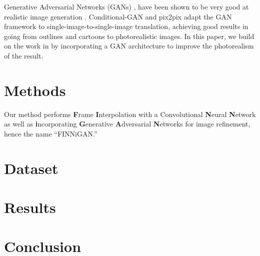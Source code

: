 \documentclass[10pt,twocolumn,letterpaper]{article}
\begin{document}
Generative Adversarial Networks (GANs) \cite{hinton}, have been shown to be very good at realistic image generation \cite{DCGAN}. Conditional-GAN \cite{CondGAN} and pix2pix \cite{pix2pix} adapt the GAN framework to single-image-to-single-image translation, achieving good results in going from outlines and cartoons to photorealistic images. In this paper, we build on the work in \cite{cs229paper} by incorporating a GAN architecture to improve the photorealism of the result.


\section{Methods}
Our method performs \textbf{F}rame \textbf{I}nterpolation with a Convolutional \textbf{N}eural \textbf{N}etwork as well as \textbf{i}ncorporating \textbf{G}enerative \textbf{A}dversarial \textbf{N}etworks for image refinement, hence the name ``FINNiGAN.''

\section{Dataset}

\section{Results}

\section{Conclusion}

{\small



}
\end{document}
